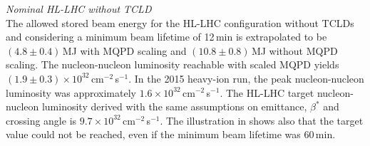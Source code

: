\newpage

\textit{Nominal HL-LHC without TCLD} \\ 
The allowed stored beam energy for the HL-LHC configuration without TCLDs and considering a minimum beam lifetime of 12\,min is extrapolated to be $(4.8\pm0.4)$\,MJ with MQPD scaling and $(10.8\pm0.8)\,$MJ without MQPD scaling. The nucleon-nucleon luminosity reachable with scaled MQPD yields \mbox{$(1.9 \pm 0.3)\times 10^{32}$\,cm$^{-2}$\,s$^{-1}$}. In the 2015 heavy-ion run, the peak nucleon-nucleon luminosity was approximately \mbox{$1.6 \times 10^{32}$\,cm$^{-2}$\,s$^{-1}$}. The HL-LHC target nucleon-nucleon luminosity derived with the same assumptions on emittance, $\beta^*$ and crossing angle is \mbox{$9.7 \times 10^{32}$\,cm$^{-2}$\,s$^{-1}$}. The illustration in  shows also that the target value could not be reached, even if the minimum beam lifetime was 60\,min.




